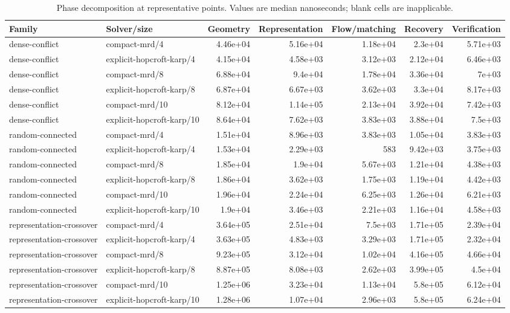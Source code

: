 \begin{table}[t]
\caption{Phase decomposition at representative points. Values are median nanoseconds; blank cells are inapplicable.}
\label{tab:paper-scaling-phases}
\begin{tabular}{llrrrrr}
\toprule
Family & Solver/size & Geometry & Representation & Flow/matching & Recovery & Verification \\
\midrule
dense-conflict & compact-mrd/4 & 4.46e+04 & 5.16e+04 & 1.18e+04 & 2.3e+04 & 5.71e+03 \\
dense-conflict & explicit-hopcroft-karp/4 & 4.15e+04 & 4.58e+03 & 3.12e+03 & 2.12e+04 & 6.46e+03 \\
dense-conflict & compact-mrd/8 & 6.88e+04 & 9.4e+04 & 1.78e+04 & 3.36e+04 & 7e+03 \\
dense-conflict & explicit-hopcroft-karp/8 & 6.87e+04 & 6.67e+03 & 3.62e+03 & 3.3e+04 & 8.17e+03 \\
dense-conflict & compact-mrd/10 & 8.12e+04 & 1.14e+05 & 2.13e+04 & 3.92e+04 & 7.42e+03 \\
dense-conflict & explicit-hopcroft-karp/10 & 8.64e+04 & 7.62e+03 & 3.83e+03 & 3.88e+04 & 7.5e+03 \\
random-connected & compact-mrd/4 & 1.51e+04 & 8.96e+03 & 3.83e+03 & 1.05e+04 & 3.83e+03 \\
random-connected & explicit-hopcroft-karp/4 & 1.53e+04 & 2.29e+03 & 583 & 9.42e+03 & 3.75e+03 \\
random-connected & compact-mrd/8 & 1.85e+04 & 1.9e+04 & 5.67e+03 & 1.21e+04 & 4.38e+03 \\
random-connected & explicit-hopcroft-karp/8 & 1.86e+04 & 3.62e+03 & 1.75e+03 & 1.19e+04 & 4.42e+03 \\
random-connected & compact-mrd/10 & 1.96e+04 & 2.24e+04 & 6.25e+03 & 1.26e+04 & 6.21e+03 \\
random-connected & explicit-hopcroft-karp/10 & 1.9e+04 & 3.46e+03 & 2.21e+03 & 1.16e+04 & 4.58e+03 \\
representation-crossover & compact-mrd/4 & 3.64e+05 & 2.51e+04 & 7.5e+03 & 1.71e+05 & 2.39e+04 \\
representation-crossover & explicit-hopcroft-karp/4 & 3.63e+05 & 4.83e+03 & 3.29e+03 & 1.71e+05 & 2.32e+04 \\
representation-crossover & compact-mrd/8 & 9.23e+05 & 3.12e+04 & 1.02e+04 & 4.16e+05 & 4.66e+04 \\
representation-crossover & explicit-hopcroft-karp/8 & 8.87e+05 & 8.08e+03 & 2.62e+03 & 3.99e+05 & 4.5e+04 \\
representation-crossover & compact-mrd/10 & 1.25e+06 & 3.23e+04 & 1.13e+04 & 5.8e+05 & 6.12e+04 \\
representation-crossover & explicit-hopcroft-karp/10 & 1.28e+06 & 1.07e+04 & 2.96e+03 & 5.8e+05 & 6.24e+04 \\
\bottomrule
\end{tabular}
\end{table}
